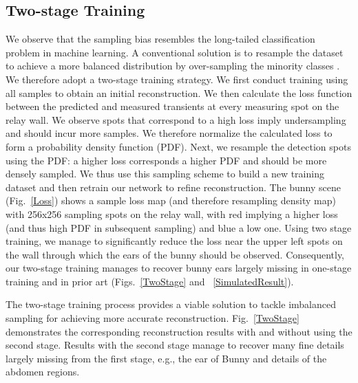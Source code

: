 \documentclass[10pt,journal,compsoc]{IEEEtran}
\begin{document}
\subsection{Two-stage Training}
We observe that the sampling bias resembles the long-tailed classification problem in machine learning. A conventional solution is to resample the dataset to achieve a more balanced distribution by over-sampling the minority classes \cite{2020Kang}. We therefore adopt a two-stage training strategy. We first conduct training using all samples to obtain an initial reconstruction. We then calculate the loss function between the predicted and measured transients at every measuring spot on the relay wall. We observe spots that correspond to a high loss imply undersampling and should incur more samples. We therefore normalize the calculated loss to form a probability density function (PDF). Next, we resample the detection spots using the PDF: a higher loss corresponds a higher PDF and should be more densely sampled. We thus use this sampling scheme to build a new training dataset and then retrain our network to refine reconstruction. The bunny scene (Fig.~\ref{Loss}) shows a sample loss map (and therefore resampling density map) with 256x256 sampling spots on the relay wall, with red implying a higher loss (and thus high PDF in subsequent sampling) and blue a low one. Using two stage training, we manage to significantly reduce the loss near the upper left spots on the wall through which the ears of the bunny should be observed. Consequently, our two-stage training manages to recover bunny ears largely missing in one-stage training and in prior art (Figs.~\ref{TwoStage} and ~\ref{SimulatedResult}).





The two-stage training process provides a viable solution to tackle imbalanced sampling for achieving more accurate reconstruction. Fig.~\ref{TwoStage} demonstrates the corresponding reconstruction results with and without using the second stage. Results with the second stage manage to recover many fine details largely missing from the first stage, e.g., the ear of Bunny and details of the abdomen regions. 
\end{document}
